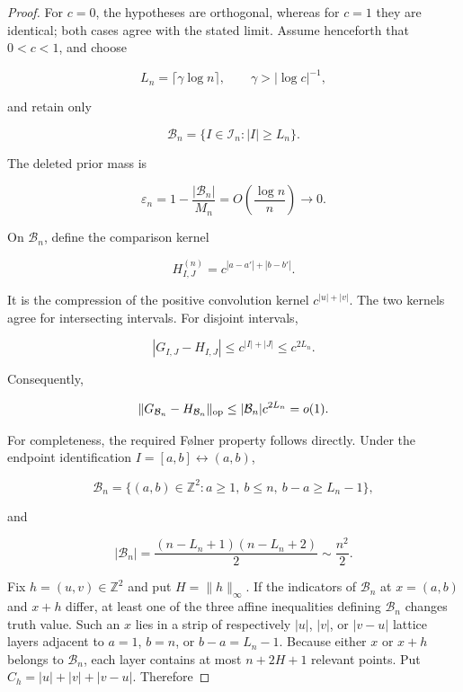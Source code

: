 \begin{proof}
For \(c=0\), the hypotheses are orthogonal, whereas for \(c=1\) they are
identical; both cases agree with the stated limit. Assume henceforth that
\(0<c<1\), and choose

\[
L_n=\lceil\gamma\log n\rceil,
\qquad \gamma>|\log c|^{-1},
\]

and retain only

\[
\mathcal B_n=\{I\in\mathcal I_n:|I|\ge L_n\}.
\]

The deleted prior mass is

\begin{equation}\label{eq:short-interval-mass}
\varepsilon_n
=1-\frac{|\mathcal B_n|}{M_n}
=O\!\left(\frac{\log n}{n}\right)\to0.
\end{equation}

On \(\mathcal B_n\), define the comparison kernel

\begin{equation}\label{eq:comparison-kernel}
H^{(n)}_{I,J}=c^{|a-a'|+|b-b'|}.
\end{equation}

It is the compression of the positive convolution kernel \(c^{|u|+|v|}\). The two kernels agree for intersecting intervals. For disjoint intervals,

\[
|G_{I,J}-H_{I,J}|
\le c^{|I|+|J|}\le c^{2L_n}.
\]

Consequently,

\begin{equation}\label{eq:comparison-operator}
\|G_{\mathcal B_n}-H_{\mathcal B_n}\|_{\rm op}
\le|\mathcal B_n|c^{2L_n}=o(1).
\end{equation}

For completeness, the required Følner property follows directly. Under the endpoint
identification \(I=[a,b]\leftrightarrow(a,b)\),

\[
\mathcal B_n
=\{(a,b)\in\mathbb Z^2:a\ge1,\ b\le n,\ b-a\ge L_n-1\},
\]

and

\begin{equation}\label{eq:long-domain-cardinality}
|\mathcal B_n|
=\frac{(n-L_n+1)(n-L_n+2)}2
\sim\frac{n^2}{2}.
\end{equation}

Fix \(h=(u,v)\in\mathbb Z^2\) and put \(H=\|h\|_\infty\). If the indicators
of \(\mathcal B_n\) at \(x=(a,b)\) and \(x+h\) differ, at least one of the
three affine inequalities defining \(\mathcal B_n\) changes truth value.
Such an \(x\) lies in a strip of respectively \(|u|\), \(|v|\), or
\(|v-u|\) lattice layers adjacent to
\(a=1\), \(b=n\), or \(b-a=L_n-1\). Because either \(x\) or \(x+h\) belongs
to \(\mathcal B_n\), each layer contains at most \(n+2H+1\) relevant points.
Put \(C_h=|u|+|v|+|v-u|\). Therefore


\end{proof}
